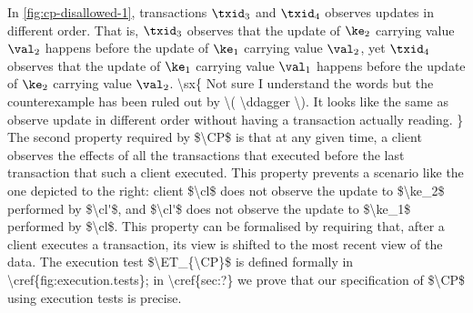 In \cref{fig:cp-disallowed-1}, transactions $\txid_{3}$ and \( \txid_4 \) observes updates in different order.
That is, \( \txid_3 \) observes that the update of $\ke_2$ carrying value $\val_2$ happens before the update of $\ke_1$ carrying value $\val_2$,
yet $\txid_{4}$ observes that the update of $\ke_1$ carrying value $\val_1$ happens before the update of $\ke_2$ carrying value $\val_2$. 
\ac{
    \sx{ Not sure I understand the words but the counterexample has  been ruled out by \( \ddagger \). 
         It looks like the same as observe update in different order without having a transaction actually reading. }
The second property required by $\CP$ is that at any given time, 
a client observes the effects of all the transactions that  
executed before the last transaction that such a client executed. 
This property prevents a scenario like the one depicted to the 
right: client $\cl$ does not observe the update to $\ke_2$ performed 
by $\cl'$, and $\cl'$ does not observe the update to $\ke_1$ performed 
by $\cl$. This property can be formalised by requiring that, after 
a client executes a transaction, its view is shifted to the most recent 
view of the data. The execution test $\ET_{\CP}$ is defined formally 
in \cref{fig:execution.tests}; in \cref{sec:?} we prove that our specification  
of $\CP$ using execution tests is precise. 
}



